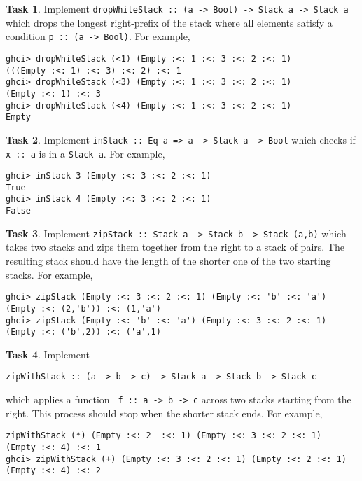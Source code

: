 \documentclass{article}[12pt]
\theoremstyle{definition}
\newtheorem{task}{Task}
\begin{document}
\begin{task}
    Implement \verb|dropWhileStack :: (a -> Bool) -> Stack a -> Stack a| which drops the longest right-prefix of the stack where all elements satisfy a condition \verb|p :: (a -> Bool)|.  For example,
    \begin{verbatim}
ghci> dropWhileStack (<1) (Empty :<: 1 :<: 3 :<: 2 :<: 1)
(((Empty :<: 1) :<: 3) :<: 2) :<: 1
ghci> dropWhileStack (<3) (Empty :<: 1 :<: 3 :<: 2 :<: 1)
(Empty :<: 1) :<: 3
ghci> dropWhileStack (<4) (Empty :<: 1 :<: 3 :<: 2 :<: 1)
Empty\end{verbatim}
\end{task}

\begin{task}
    Implement \verb|inStack :: Eq a => a -> Stack a -> Bool| which checks if \verb|x :: a| is in a \verb|Stack a|. For example,
    \begin{verbatim}
ghci> inStack 3 (Empty :<: 3 :<: 2 :<: 1)
True
ghci> inStack 4 (Empty :<: 3 :<: 2 :<: 1)
False\end{verbatim}
\end{task}

\begin{task}
    Implement \verb|zipStack :: Stack a -> Stack b -> Stack (a,b)| which takes two stacks and zips them together from the right to a stack of pairs. The resulting stack should have the length of the shorter one of the two starting stacks. For example,
    \begin{verbatim}
ghci> zipStack (Empty :<: 3 :<: 2 :<: 1) (Empty :<: 'b' :<: 'a')
(Empty :<: (2,'b')) :<: (1,'a')
ghci> zipStack (Empty :<: 'b' :<: 'a') (Empty :<: 3 :<: 2 :<: 1)
(Empty :<: ('b',2)) :<: ('a',1)\end{verbatim}
\end{task}

\begin{task}
    Implement \begin{verbatim}zipWithStack :: (a -> b -> c) -> Stack a -> Stack b -> Stack c \end{verbatim} 
    which applies a function \verb| f :: a -> b -> c| across two stacks starting from the right. This process should stop when the shorter stack ends. For example,
    \begin{verbatim}
zipWithStack (*) (Empty :<: 2  :<: 1) (Empty :<: 3 :<: 2 :<: 1)
(Empty :<: 4) :<: 1
ghci> zipWithStack (+) (Empty :<: 3 :<: 2 :<: 1) (Empty :<: 2 :<: 1)
(Empty :<: 4) :<: 2\end{verbatim}
\end{task}
\end{document}
